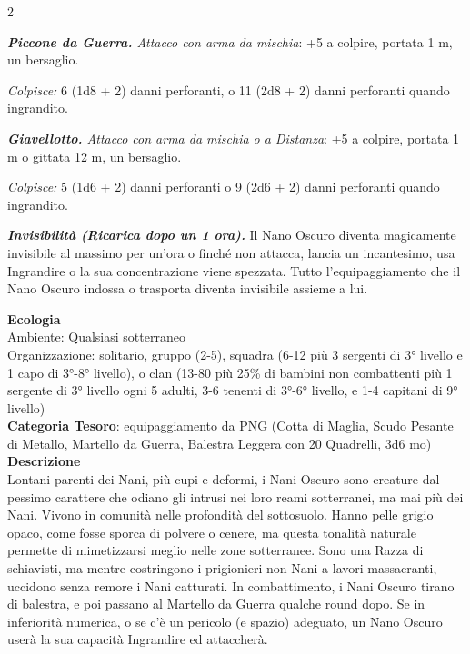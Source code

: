 \begin{multicols}{2}
{\emph{\textbf{Piccone da Guerra.} Attacco con arma da mischia}: +5 a colpire, portata 1 m, un bersaglio.

\emph{Colpisce:} 6 (1d8 + 2) danni perforanti, o 11 (2d8 + 2) danni perforanti quando ingrandito.

\emph{\textbf{Giavellotto.} Attacco con arma da mischia o a Distanza}: +5 a colpire, portata 1 m o gittata 12 m, un bersaglio.

\emph{Colpisce:} 5 (1d6 + 2) danni perforanti o 9 (2d6 + 2) danni
perforanti quando ingrandito.

\emph{\textbf{Invisibilità (Ricarica dopo un 1 ora).}} Il Nano Oscuro diventa magicamente invisibile al massimo per un'ora o finché non attacca, lancia un incantesimo, usa Ingrandire o la sua concentrazione viene spezzata. Tutto l'equipaggiamento che il Nano Oscuro indossa o trasporta diventa invisibile assieme a lui.

\textbf{Ecologia}\\
Ambiente: Qualsiasi sotterraneo\\
Organizzazione: solitario, gruppo (2-5), squadra (6-12 più 3 sergenti di 3° livello e 1 capo di 3°-8° livello), o clan (13-80 più 25\% di bambini non combattenti più 1 sergente di 3° livello ogni 5 adulti, 3-6 tenenti di 3°-6° livello, e 1-4 capitani di 9° livello)\\
\textbf{Categoria Tesoro}: equipaggiamento da PNG (Cotta di Maglia, Scudo Pesante di Metallo, Martello da Guerra, Balestra Leggera con 20 Quadrelli, 3d6 mo)\\
\textbf{Descrizione}\\
Lontani parenti dei Nani, più cupi e deformi, i Nani Oscuro sono creature dal pessimo carattere che odiano gli intrusi nei loro reami sotterranei, ma mai più dei Nani. Vivono in comunità nelle profondità del sottosuolo. Hanno pelle grigio opaco, come fosse sporca di polvere o cenere, ma questa tonalità naturale permette di mimetizzarsi meglio nelle zone sotterranee. Sono una Razza di schiavisti, ma mentre costringono i prigionieri non Nani a lavori massacranti, uccidono senza remore i Nani catturati. In combattimento, i Nani Oscuro tirano di balestra, e poi passano al Martello da Guerra qualche round dopo. Se in inferiorità numerica, o se c'è un pericolo (e spazio) adeguato, un Nano Oscuro userà la sua capacità Ingrandire ed attaccherà.


}
\end{multicols}
